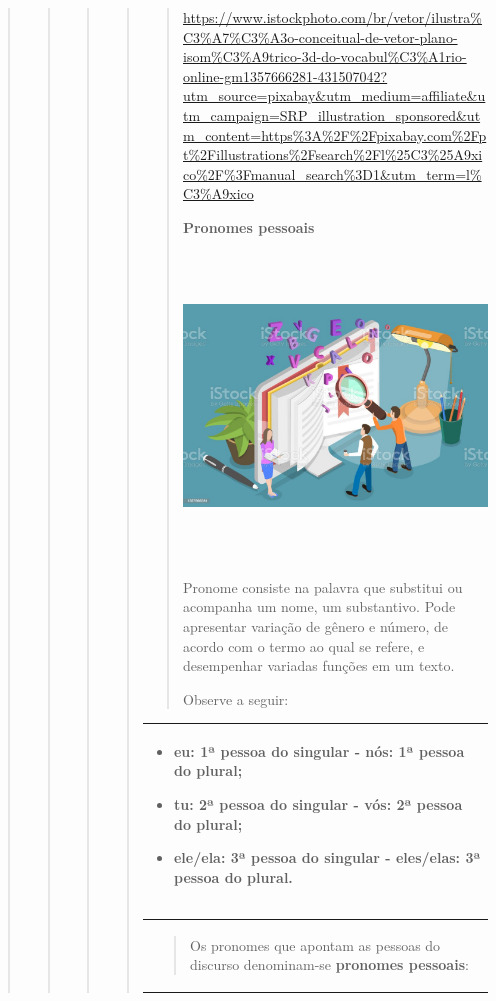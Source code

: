 \begin{quote}
\begin{quote}
\begin{quote}
\begin{quote}
\begin{quote}
\url{https://www.istockphoto.com/br/vetor/ilustra\%C3\%A7\%C3\%A3o-conceitual-de-vetor-plano-isom\%C3\%A9trico-3d-do-vocabul\%C3\%A1rio-online-gm1357666281-431507042?utm_source=pixabay\&utm_medium=affiliate\&utm_campaign=SRP_illustration_sponsored\&utm_content=https\%3A\%2F\%2Fpixabay.com\%2Fpt\%2Fillustrations\%2Fsearch\%2Fl\%25C3\%25A9xico\%2F\%3Fmanual_search\%3D1\&utm_term=l\%C3\%A9xico}

\textbf{Pronomes pessoais}

\includegraphics[width=4.81250in,height=3.20531in]{media/image33.jpeg}

Pronome consiste na palavra que substitui ou acompanha um nome, um
substantivo. Pode apresentar variação de gênero e número, de acordo com
o termo ao qual se refere, e desempenhar variadas funções em um texto.

Observe a seguir:
\end{quote}

\begin{longtable}[]{@{}l@{}}
\toprule
\begin{minipage}[t]{0.97\columnwidth}\raggedright\strut
\begin{itemize}
\item
  eu: 1ª pessoa do singular - nós: 1ª pessoa do plural;
\item
  tu: 2ª pessoa do singular - vós: 2ª pessoa do plural;
\item
  ele/ela: 3ª pessoa do singular - eles/elas: 3ª pessoa do plural.
\end{itemize}\strut
\end{minipage}\tabularnewline
\bottomrule
\end{longtable}

\begin{longtable}[]{@{}l@{}}
\toprule
\begin{minipage}[t]{0.97\columnwidth}\raggedright\strut
\begin{quote}
Os pronomes que apontam as pessoas do discurso denominam-se
\textbf{pronomes pessoais}:
\end{quote}


\end{minipage}
\end{longtable}
\end{quote}
\end{quote}
\end{quote}
\end{quote}
